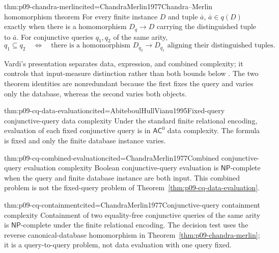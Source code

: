\begin{hbtheorem}{thm:p09-chandra-merlin}{cited=ChandraMerlin1977}{Chandra--Merlin homomorphism theorem}
For every finite instance \(D\) and tuple \(\bar a\),
\(\bar a\in q(D)\) exactly when there is a homomorphism
\(D_q\to D\) carrying the distinguished tuple to \(\bar a\).  For
conjunctive queries \(q_1,q_2\) of the same arity,
\[
 q_1\subseteq q_2
 \quad\Longleftrightarrow\quad
 \text{there is a homomorphism }D_{q_2}\to D_{q_1}
 \text{ aligning their distinguished tuples}.
\]
\end{hbtheorem}

Vardi's presentation separates data, expression, and combined complexity; it
controls that input-measure distinction rather than both bounds below
\cite{Vardi1982}.  The two theorem identities are nonredundant because the
first fixes the query and varies only the database, whereas the second varies
both objects.

\begin{hbtheorem}{thm:p09-cq-data-evaluation}{cited=AbiteboulHullVianu1995}{Fixed-query conjunctive-query data complexity}
Under the standard finite relational encoding, evaluation of each fixed
conjunctive query is in \(\mathsf{AC}^{0}\) data complexity.  The formula is
fixed and only the finite database instance varies.
\end{hbtheorem}

\begin{hbtheorem}{thm:p09-cq-combined-evaluation}{cited=ChandraMerlin1977}{Combined conjunctive-query evaluation complexity}
Boolean conjunctive-query evaluation is \(\mathsf{NP}\)-complete when the query
and finite database instance are both input.  This combined problem is not the
fixed-query problem of Theorem~\ref{thm:p09-cq-data-evaluation}.
\end{hbtheorem}

\begin{hbtheorem}{thm:p09-cq-containment}{cited=ChandraMerlin1977}{Conjunctive-query containment complexity}
Containment of two equality-free conjunctive queries of the same arity is
\(\mathsf{NP}\)-complete under the finite relational encoding.  The decision
test uses the reverse canonical-database homomorphism in
Theorem~\ref{thm:p09-chandra-merlin}; it is a query-to-query problem, not data
evaluation with one query fixed.
\end{hbtheorem}

